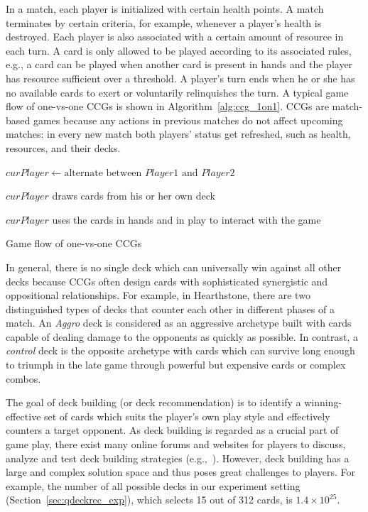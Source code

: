 In a match, each player is initialized with certain health points. A match terminates by certain criteria, for example, whenever a player's health is destroyed. Each player is also associated with a certain amount of resource in each turn. A card is only allowed to be played according to its associated rules, e.g., a card can be played when another card is present in hands and the player has resource sufficient over a threshold. A player's turn ends when he or she has no available cards to exert or voluntarily relinquishes the turn. A typical game flow of one-vs-one CCGs is shown in Algorithm~\ref{alg:ccg_1on1}. CCGs are match-based games because any actions in previous matches do not affect upcoming matches: in every new match both players' status get refreshed, such as health, resources, and their decks.


\begin{algorithm}
    \BlankLine
    
     {
    \BlankLine
	$curPlayer \leftarrow \text{alternate between } Player1 \text{ and } Player 2$ 
    
    \BlankLine
	$curPlayer$ draws cards from his or her own deck  
 
  	\BlankLine
    $curPlayer$ uses the cards in hands and in play to interact with the game
   		
  	\BlankLine 	
    }
    \caption{Game flow of one-vs-one CCGs}
    \label{alg:ccg_1on1}
\end{algorithm}


In general, there is no single deck which can universally win against all other decks because CCGs often design cards with sophisticated synergistic and oppositional relationships. For example, in Hearthstone, there are two distinguished types of decks that counter each other in different phases of a match. An \textit{Aggro} deck is considered as an aggressive archetype built with cards capable of dealing damage to the opponents as quickly as possible. In contrast, a \textit{control} deck is the opposite archetype with cards which can survive long enough to triumph in the late game through powerful but expensive cards or complex combos.

The goal of deck building (or deck recommendation) is to identify a winning-effective set of cards which suits the player's own play style and effectively counters a target opponent. As deck building is regarded as a crucial part of game play, there exist many online forums and websites for players to discuss, analyze and test deck building strategies (e.g.,~\cite{hearthpwn,icyveins}). However, deck building has a large and complex solution space and thus poses great challenges to players. For example, the number of all possible decks in our experiment setting (Section~\ref{sec:qdeckrec_exp}), which selects 15 out of 312 cards, is $1.4 \times 10^{25}$. 


